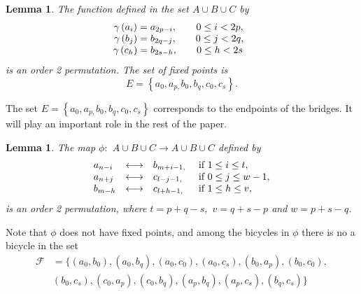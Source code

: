 \documentclass[12pt]{article}%
\newtheorem{lemma}[theorem]{Lemma}
\begin{document}
\begin{lemma}
\label{lemmagama}The function defined in the set $A\cup B\cup C$ by
\begin{equation}%
\begin{array}
[c]{ccc}%
\gamma\left(  a_{i}\right)  =a_{2p-i}, &  & 0\leq i<2p,\ \ \\
\gamma\left(  b_{j}\right)  =b_{2q-j}, &  & 0\leq j<2q,\ \ \\
\gamma\left(  c_{h}\right)  =b_{2s-h}, &  & 0\leq h<2s\ \
\end{array}
\label{permugama}%
\end{equation}
is an order 2 permutation. The set of fixed points is%
\begin{equation}
E=\left\{  a_{0},a_{p,}b_{0},b_{q},c_{0},c_{s}\right\}  \text{.}
\label{extrem}%
\end{equation}

\end{lemma}

The set $E=\left\{  a_{0},a_{p,}b_{0},b_{q},c_{0},c_{s}\right\}  $ corresponds
to the endpoints of the bridges. It will play an important role in the rest of
the paper.

\begin{lemma}
\label{lemmafi}The map $\phi:$ $A\cup B\cup C\rightarrow A\cup B\cup C$
defined by
\begin{equation}%
\begin{array}
[c]{llll}%
a_{n-i} & \longleftrightarrow & b_{m+i-1,} & \text{ if }1\leq i\leq t,\\
a_{n+j} & \longleftrightarrow & c_{l-j-1,} & \text{ if }0\leq j\leq w-1,\\
b_{m-h} & \longleftrightarrow & c_{l+h-1,} & \text{ if }1\leq h\leq v,
\end{array}
\label{permufi}%
\end{equation}
is an order 2 permutation, where $t=p+q-s,$ $v=q+s-p$ and $w=p+s-q$.
\end{lemma}

Note that $\phi$ does not have fixed points, and among the bicycles in $\phi$
there is no a bicycle in the set
\begin{align}
\mathcal{F}  &  =\{\left(  a_{0},b_{0}\right)  ,\left(  a_{0},b_{q}\right)
,\left(  a_{0},c_{0}\right)  ,\left(  a_{0},c_{s}\right)  ,\left(  b_{0}%
,a_{p}\right)  ,\left(  b_{0},c_{0}\right)  ,\label{forbiden}\\
&  \left(  b_{0},c_{s}\right)  ,\left(  c_{0},a_{p}\right)  ,\left(
c_{0},b_{q}\right)  ,\left(  a_{p},b_{q}\right)  ,\left(  a_{p},c_{s}\right)
,\left(  b_{q},c_{s}\right)  \}\nonumber
\end{align}
\end{document}

